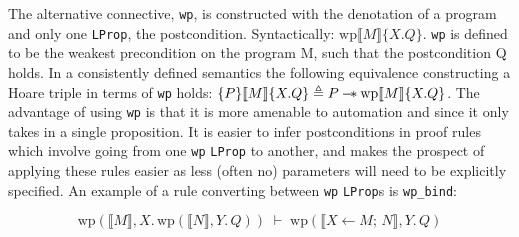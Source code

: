 
The alternative connective, \texttt{wp}, is constructed with the denotation of a program and only one \texttt{LProp}, the postcondition. Syntactically: $\mathrm{wp} \llbracket M \rrbracket \{X. Q\}$.
\texttt{wp} is defined to be the weakest precondition on the program M, such that the postcondition Q holds. In a consistently defined semantics the following equivalence
constructing a Hoare triple in terms of \texttt{wp} holds: $\{ P \} \llbracket M \rrbracket \{X. Q \} \triangleq P \mathbin{-\!*} \mathrm{wp} \llbracket M \rrbracket \{X. Q \}$. The advantage
of using \texttt{wp} is that it is more amenable to automation and since it only takes in a single proposition. It is easier to infer postconditions in proof rules
which involve going from one \texttt{wp} \texttt{LProp} to another, and makes the prospect of applying these rules easier as less (often no) parameters will need to be
explicitly specified. An example of a rule converting between \texttt{wp} \texttt{LProp}s is \texttt{wp\_bind}:

\[
\mathrm{wp}(\llbracket M \rrbracket, X.\,\mathrm{wp}(\llbracket N \rrbracket, Y.\,Q))
\;\vdash\;
\mathrm{wp}(\llbracket X \leftarrow M;\, N \rrbracket, Y.\,Q)
\]





